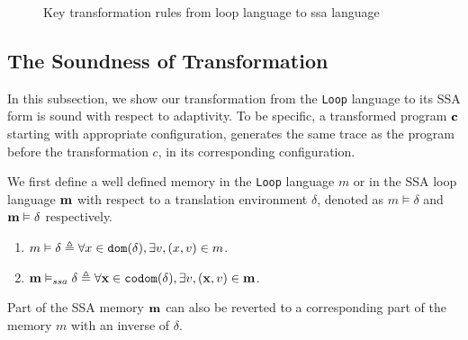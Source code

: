 {\begin{figure}
    \vspace{-0.4cm}
 \caption{Key transformation rules from loop language to ssa language}
    \label{fig:trans_rules}
    \vspace{-0.4cm}
\end{figure}
}
\subsection{The Soundness of Transformation}
In this subsection, we show our transformation from the {\tt Loop} language to its SSA form is sound with respect to adaptivity. To be specific, a transformed program ${\bf{{c}}}$ starting with appropriate configuration, generates the same trace as the program before the transformation $c$, in its corresponding configuration.

We first define a well defined memory in the {\tt Loop} language $m$ or in the SSA loop language ${\bf{{m}}}$ with respect to a translation environment $\delta$, denoted as $m \vDash \delta$ and ${\bf{{m}}} \vDash \delta$ respectively. 

\begin{defn} 
\begin{enumerate}
    \item $ m \vDash \delta  \triangleq \forall x \in \mathtt{dom}(\delta), \exists v, (x,v) \in m$.
    \item $ {\bf{{m}}} \vDash_{ssa} \delta  \triangleq \forall {\bf{{x}}} \in \mathtt{codom}(\delta), \exists v, ({\bf{{x}}},v) \in {\bf{{m}}}$.
\end{enumerate}
\end{defn}
   Part of the SSA memory ${\bf{{m}}}$ can also be reverted to a corresponding part of the memory $m$ with an inverse of $\delta$.

